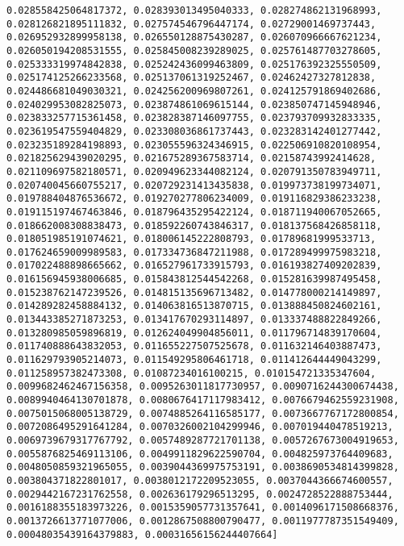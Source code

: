 \documentclass[11pt]{article}
\begin{document}
\begin{Verbatim}[commandchars=\\\{\}]
0.028558425064817372, 0.028393013495040333, 0.028274862131968993, 0.028126821895111832, 0.027574546796447174, 0.02729001469737443, 0.026952932899958138, 0.026550128875430287, 0.026070966667621234, 0.026050194208531555, 0.025845008239289025, 0.025761487703278605, 0.025333319974842838, 0.025242436099463809, 0.025176392325550509, 0.025174125266233568, 0.025137061319252467, 0.02462427327812838, 0.024486681049030321, 0.024256200969807261, 0.024125791869402686, 0.024029953082825073, 0.023874861069615144, 0.023850747145948946, 0.023833257715361458, 0.023828387146097755, 0.023793709932833335, 0.023619547559404829, 0.023308036861737443, 0.023283142401277442, 0.023235189284198893, 0.023055596324346915, 0.022506910820108954, 0.021825629439020295, 0.021675289367583714, 0.02158743992414628, 0.021109697582180571, 0.020949623344082124, 0.020791350783949711, 0.020740045660755217, 0.020729231413435838, 0.019973738199734071, 0.019788404876536672, 0.019270277806234009, 0.019116829386233238, 0.019115197467463846, 0.018796435295422124, 0.018711940067052665, 0.018662008308838473, 0.018592260743846317, 0.018137568426858118, 0.018051985191074621, 0.018006145222808793, 0.01789681999533713, 0.017624659009989583, 0.017334736847211988, 0.017289499975983218, 0.017022488898665662, 0.016527961733915793, 0.016193827409202839, 0.016156945938006685, 0.015843812544542268, 0.015281639987495458, 0.015238762147239526, 0.014815135696713482, 0.014778000214149897, 0.014289282458884132, 0.014063816513870715, 0.013888450824602161, 0.013443385271873253, 0.013417670293114897, 0.013337488822849266, 0.013280985059896819, 0.012624049904856011, 0.011796714839170604, 0.011740888643832053, 0.011655227507525678, 0.011632146403887473, 0.011629793905214073, 0.011549295806461718, 0.011412644449043299, 0.011258957382473308, 0.01087234016100215, 0.010154721335347604, 0.0099682462467156358, 0.0095263011817730957, 0.0090716244300674438, 0.0089940464130701878, 0.0080676417117983412, 0.0076679462559231908, 0.0075015068005138729, 0.0074885264116585177, 0.0073667767172800854, 0.0072086495291641284, 0.0070326002104299946, 0.007019440478519213, 0.0069739679317767792, 0.0057489287721701138, 0.0057267673004919653, 0.0055876825469113106, 0.0049911829622590704, 0.004825973764409683, 0.0048050859321965055, 0.0039044369975753191, 0.0038690534814399828, 0.003804371822801017, 0.0038012172209523055, 0.0037044366674600557, 0.0029442167231762558, 0.002636179296513295, 0.0024728522888753444, 0.0016188355183973226, 0.0015359057731357641, 0.0014096171508668376, 0.0013726613771077006, 0.0012867508800790477, 0.0011977787351549409, 0.00048035439164379883, 0.00031656156244407664]

    \end{Verbatim}
\end{document}
